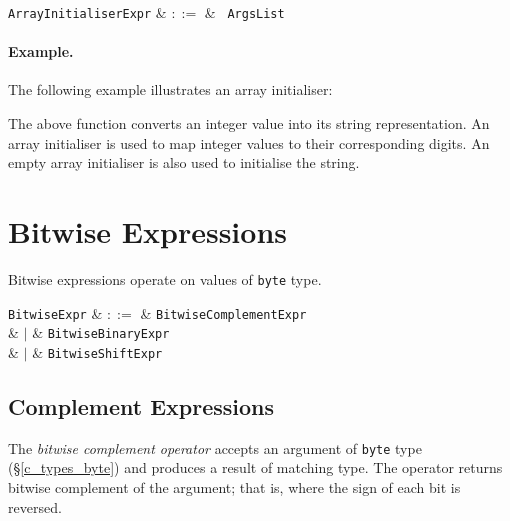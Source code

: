 \begin{syntax}
  \verb+ArrayInitialiserExpr+ & $::=$ & \token{[}\ \verb+ArgsList+ \token{]}\\
\end{syntax}

\paragraph{Example.}  The following example illustrates an array initialiser:



The above function converts an integer value into its string representation.  An array initialiser is used to map integer values to their corresponding digits.  An empty array initialiser is also used to initialise the string.


\section{Bitwise Expressions}
\label{c_expr_bitwise}

Bitwise expressions operate on values of \lstinline{byte} type.

\begin{syntax}
  \verb+BitwiseExpr+ & $::=$ & \verb+BitwiseComplementExpr+\\
                  &  $|$  & \verb+BitwiseBinaryExpr+\\
                  &  $|$  & \verb+BitwiseShiftExpr+\\
\end{syntax}


\subsection{Complement Expressions}
\label{c_expr_bitwise_complement}
The {\em bitwise complement operator} accepts an argument of \lstinline{byte} type (\S\ref{c_types_byte}) and produces a result of matching type.  The operator returns bitwise complement of the argument; that is, where the sign of each bit is reversed.

